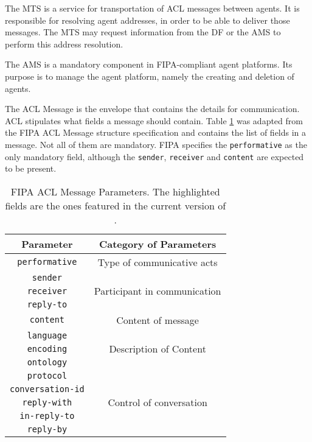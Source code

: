 The \gls{MTS} is a service for transportation of ACL messages between agents. It is responsible for resolving agent addresses, in order to be able to deliver those messages. The MTS may request information from the DF or the AMS to perform this address resolution.

The AMS is a mandatory component in FIPA-compliant agent platforms. Its purpose is to manage the agent platform, namely the creating and deletion of agents.

The ACL Message is the envelope that contains the details for communication. \gls{ACL} stipulates what fields a message should contain. Table \ref{tab:fipaACLMessage} was adapted from the FIPA ACL Message structure specification and contains the list of fields in a message. Not all of them are mandatory. FIPA specifies the \texttt{performative} as the only mandatory field, although the \texttt{sender}, \texttt{receiver} and \texttt{content} are expected to be present.

\begin{table}
	\normalsize
	\caption{FIPA ACL Message Parameters. The highlighted fields are the ones featured in the current version of \apiname{}.}
	\label{tab:fipaACLMessage}
	\begin{center}
		\begin{tabular}{c|c}
		\hline
		\textbf{Parameter} & \textbf{Category of Parameters} \\
		\hline
		\colorbox{Apricot}{\texttt{performative}} & Type of communicative acts \\
		\hline
		\colorbox{Apricot}{\texttt{sender}} & \multirow{3}{*}{Participant in communication} \\
		\cline{1-1}
		\colorbox{Apricot}{\texttt{receiver}} \\
		\cline{1-1}
		\texttt{reply-to}  \\
		\hline
		\colorbox{Apricot}{\texttt{content}} & Content of message \\
		\hline
		\texttt{language} & \multirow{3}{*}{Description of Content} \\
		\cline{1-1}
		\texttt{encoding} \\
		\cline{1-1}
		\colorbox{Apricot}{\texttt{ontology}} \\
		\hline
		\colorbox{Apricot}{\texttt{protocol}} & \multirow{5}{*}{Control of conversation} \\
		\cline{1-1}
		\colorbox{Apricot}{\texttt{conversation-id}} \\
		\cline{1-1}
		\texttt{reply-with} \\
		\cline{1-1}
		\texttt{in-reply-to} \\
		\cline{1-1}
		\colorbox{Apricot}{\texttt{reply-by}} \\
		\hline
		\end{tabular}
	\end{center}
\end{table} 

